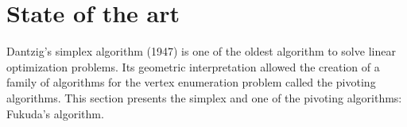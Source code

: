 \section{State of the art}
\label{section_sota}
Dantzig's simplex algorithm (1947) is one of the oldest algorithm to solve linear optimization problems. Its geometric interpretation allowed the creation of a family of algorithms for the vertex enumeration problem called the pivoting algorithms. This section presents the simplex and one of the pivoting algorithms: Fukuda's algorithm.


